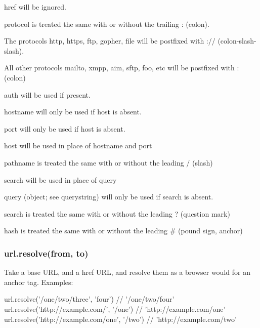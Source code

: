 \begin{DoxyItemize}
\item {\ttfamily href} will be ignored.
\item {\ttfamily protocol} is treated the same with or without the trailing {\ttfamily \+:} (colon).
\begin{DoxyItemize}
\item The protocols {\ttfamily http}, {\ttfamily https}, {\ttfamily ftp}, {\ttfamily gopher}, {\ttfamily file} will be postfixed with {\ttfamily \+://} (colon-\/slash-\/slash).
\item All other protocols {\ttfamily mailto}, {\ttfamily xmpp}, {\ttfamily aim}, {\ttfamily sftp}, {\ttfamily foo}, etc will be postfixed with {\ttfamily \+:} (colon)
\end{DoxyItemize}
\item {\ttfamily auth} will be used if present.
\item {\ttfamily hostname} will only be used if {\ttfamily host} is absent.
\item {\ttfamily port} will only be used if {\ttfamily host} is absent.
\item {\ttfamily host} will be used in place of {\ttfamily hostname} and {\ttfamily port}
\item {\ttfamily pathname} is treated the same with or without the leading {\ttfamily /} (slash)
\item {\ttfamily search} will be used in place of {\ttfamily query}
\item {\ttfamily query} (object; see {\ttfamily querystring}) will only be used if {\ttfamily search} is absent.
\item {\ttfamily search} is treated the same with or without the leading {\ttfamily ?} (question mark)
\item {\ttfamily hash} is treated the same with or without the leading {\ttfamily \#} (pound sign, anchor)
\end{DoxyItemize}

\subsubsection*{url.\+resolve(from, to)}

Take a base U\+RL, and a href U\+RL, and resolve them as a browser would for an anchor tag. Examples\+: \begin{DoxyVerb}url.resolve('/one/two/three', 'four')         // '/one/two/four'
url.resolve('http://example.com/', '/one')    // 'http://example.com/one'
url.resolve('http://example.com/one', '/two') // 'http://example.com/two'\end{DoxyVerb}
 